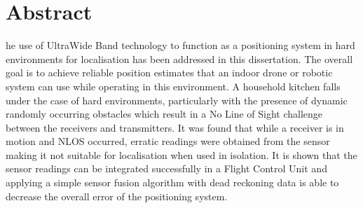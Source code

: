 %
%
%

\chapter*{Abstract}
\begin{SingleSpace}
he use of UltraWide Band technology to function as a positioning system in hard environments for localisation has been addressed in this dissertation.
    The overall goal is to achieve reliable position estimates that an indoor drone or robotic system can use while operating in this environment.
    A household kitchen falls under the case of hard environments, particularly with the presence of dynamic randomly occurring obstacles which result in a No Line of Sight challenge between the receivers and transmitters.
    It was found that while a receiver is in motion and NLOS occurred, erratic readings were obtained from the sensor making it not suitable for localisation when used in isolation.
    It is shown that the sensor readings can be integrated successfully in a Flight Control Unit and applying a simple sensor fusion algorithm with dead reckoning data is able to decrease the overall error of the positioning system.
\end{SingleSpace}
\clearpage